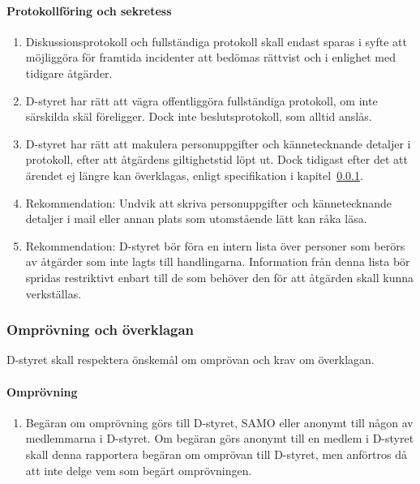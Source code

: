 \documentclass{dtek}
\begin{document}
\paragraph{Protokollföring och sekretess}
\begin{enumerate}[resume]
  \item Diskussionsprotokoll och fullständiga protokoll skall endast sparas i syfte att möjliggöra för framtida incidenter att bedömas rättvist och i enlighet med tidigare åtgärder.
  \item D-styret har rätt att vägra offentliggöra fullständiga protokoll, om inte särskilda skäl föreligger. Dock inte beslutsprotokoll, som alltid anslås.
  \item D-styret har rätt att makulera personuppgifter och kännetecknande detaljer i protokoll, efter att åtgärdens giltighetstid löpt ut. Dock tidigast efter det att ärendet ej längre kan överklagas, enligt specifikation i kapitel~\ref{subsubsec:omprovning_o_overklagan}.
  \item Rekommendation: Undvik att skriva personuppgifter och kännetecknande detaljer i mail eller annan plats som utomstående lätt kan råka läsa.
  \item Rekommendation: D-styret bör föra en intern lista över personer som berörs av åtgärder som inte lagts till handlingarna. Information från denna lista bör spridas restriktivt enbart till de som behöver den för att åtgärden skall kunna verkställas.
\end{enumerate}

\subsubsection{Omprövning och överklagan}
\label{subsubsec:omprovning_o_overklagan}

D-styret skall respektera önskemål om omprövan och krav om överklagan.

\paragraph{Omprövning}
\begin{enumerate}[resume]
  \item Begäran om omprövning görs till D-styret, SAMO eller anonymt till någon av medlemmarna i D-styret. Om begäran görs anonymt till en medlem i D-styret skall denna rapportera begäran om omprövan till D-styret, men anförtros då att inte delge vem som begärt omprövningen.
\end{enumerate}
\end{document}
